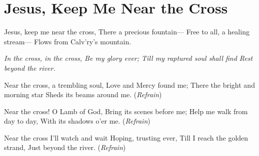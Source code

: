 \starttocol
\chapter{Jesus, Keep Me Near the Cross}
\nexttocol
\hfill{\it }
\stoptocol
\starttocol
\startlines
{\sc Jesus}, keep me near the cross,
There a precious fountain---
Free to all, a healing stream---
Flows from Calv'ry's mountain.

{\it
In the cross, in the cross,
Be my glory ever;
Till my raptured soul shall find
Rest beyond the river.}

Near the cross, a trembling soul,
Love and Mercy found me;
There the bright and morning star
Sheds its beams around me.
          \hfill({\it Refrain})~~~~~~~~~

Near the cross! O Lamb of God,
Bring its scenes before me;
Help me walk from day to day,
With its shadows o'er me.
          \hfill({\it Refrain})~~~~~~~~~

Near the cross I'll watch and wait
Hoping, trusting ever,
Till I reach the golden strand,
Just beyond the river.
          \hfill({\it Refrain})~~~~~~~~~
\stoplines
\nexttocol

\stoptocol
